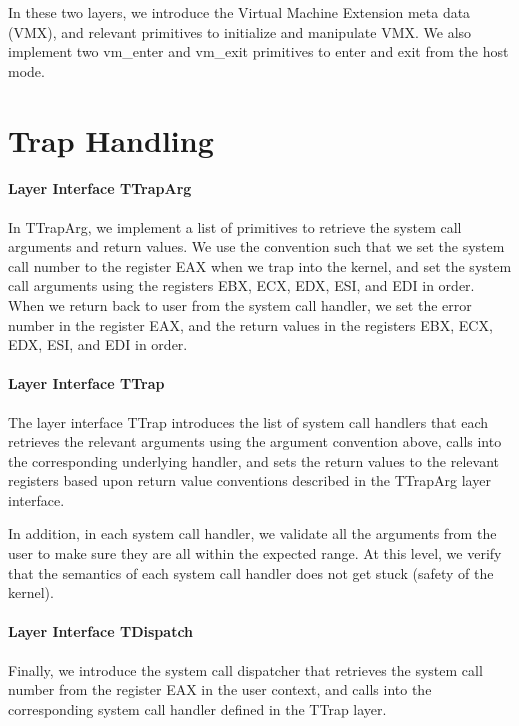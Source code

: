 In these two layers, we introduce the Virtual Machine Extension meta data (VMX), and relevant primitives to initialize
and manipulate VMX. We also implement two \textsf{vm\_enter} and \textsf{vm\_exit} primitives to enter and exit
from the host mode.

\section{Trap Handling}

\paragraph{Layer Interface TTrapArg}

In TTrapArg, we implement a list of primitives to retrieve the system call arguments and return values.
We use the convention such that we set the system call number to the register \textsf{EAX} when we trap into the kernel,
and set the system call arguments using the registers \textsf{EBX}, \textsf{ECX}, \textsf{EDX}, \textsf{ESI}, and \textsf{EDI}
in order. When we return back to user from the system call handler, we set the error number in the register \textsf{EAX},
and the return values in the registers \textsf{EBX}, \textsf{ECX}, \textsf{EDX}, \textsf{ESI}, and \textsf{EDI}
in order.

\paragraph{Layer Interface TTrap}

The layer interface TTrap introduces the list of system call handlers that each retrieves the relevant arguments
using the argument convention above, calls into the corresponding underlying handler, and sets the return values
to the relevant registers based upon return value conventions described in the TTrapArg layer interface.

In addition, in each system call handler, we validate all the arguments from the user to make sure they are all
within the expected range. At this level, we verify that the semantics of each system call handler does not get stuck (safety
of the kernel).

\paragraph{Layer Interface TDispatch}

Finally, we introduce the system call dispatcher that retrieves the system call number from the register
\textsf{EAX} in the user context, and calls into the corresponding system call handler defined in the TTrap layer.

